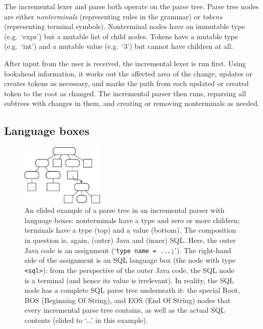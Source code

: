 \documentclass[sigplan,screen]{acmart}\settopmatter{printfolios=true,printccs=false,printacmref=false}
\begin{document}
The incremental lexer and parse both operate on the parse tree. Parse tree nodes
are either \emph{nonterminals} (representing rules in the grammar) or
\emph{tokens} (representing terminal symbols). Nonterminal nodes have an
immutable type (e.g.~`expr') but a mutable list of child nodes.
Tokens have a mutable type (e.g.~`int')
and a mutable value (e.g.~`3') but cannot have children at all.

After input from the user is received, the incremental lexer is run first.
Using lookahead information, it works out the affected area of the change,
updates or creates tokens as necessary, and marks the path from each updated or
created token to the root as changed. The incremental parser then runs,
reparsing all subtrees with changes in them, and creating or removing
nonterminals as needed.


\subsection{Language boxes}

\begin{figure}[t]
\begin{center}
\includegraphics[width=0.35\textwidth]{images/lbox_parsetree}
\caption{An elided example of a parse tree in an incremental parser with
  language boxes: nonterminals have a type and zero or more children; terminals
  have a type (top) and a value (bottom). The composition in question is,
  again, (outer) Java and (inner) SQL. Here, the outer Java code is an
  assignment (`\texttt{type name = ...;}'). The right-hand side of the
  assignment is an SQL language box (the node with type \texttt{<sql>}): from the
  perspective of the outer Java code, the SQL node is a terminal (and hence its
  value is irrelevant). In reality, the SQL node has a complete SQL parse tree
  underneath it: the special Root, BOS (Beginning Of String), and EOS (End Of
  String) nodes that every incremental parse tree contains, as well as the actual
  SQL contents (elided to `...' in this example). }
\label{fig:lboxtree}
\end{center}
\end{figure}
\end{document}
